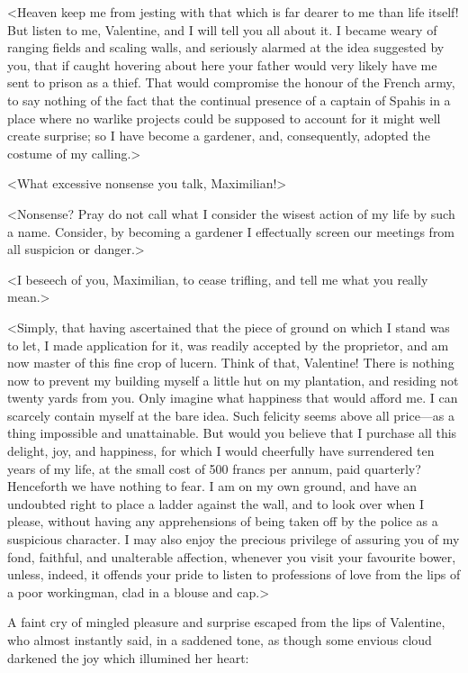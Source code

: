 <Heaven keep me from jesting with that which is far dearer to me than life itself! But listen to me, Valentine, and I will tell you all about it. I became weary of ranging fields and scaling walls, and seriously alarmed at the idea suggested by you, that if caught hovering about here your father would very likely have me sent to prison as a thief. That would compromise the honour of the French army, to say nothing of the fact that the continual presence of a captain of Spahis in a place where no warlike projects could be supposed to account for it might well create surprise; so I have become a gardener, and, consequently, adopted the costume of my calling.> 

 <What excessive nonsense you talk, Maximilian!> 

 <Nonsense? Pray do not call what I consider the wisest action of my life by such a name. Consider, by becoming a gardener I effectually screen our meetings from all suspicion or danger.>

<I beseech of you, Maximilian, to cease trifling, and tell me what you really mean.> 

 <Simply, that having ascertained that the piece of ground on which I stand was to let, I made application for it, was readily accepted by the proprietor, and am now master of this fine crop of lucern. Think of that, Valentine! There is nothing now to prevent my building myself a little hut on my plantation, and residing not twenty yards from you. Only imagine what happiness that would afford me. I can scarcely contain myself at the bare idea. Such felicity seems above all price—as a thing impossible and unattainable. But would you believe that I purchase all this delight, joy, and happiness, for which I would cheerfully have surrendered ten years of my life, at the small cost of 500 francs per annum, paid quarterly? Henceforth we have nothing to fear. I am on my own ground, and have an undoubted right to place a ladder against the wall, and to look over when I please, without having any apprehensions of being taken off by the police as a suspicious character. I may also enjoy the precious privilege of assuring you of my fond, faithful, and unalterable affection, whenever you visit your favourite bower, unless, indeed, it offends your pride to listen to professions of love from the lips of a poor workingman, clad in a blouse and cap.> 

 A faint cry of mingled pleasure and surprise escaped from the lips of Valentine, who almost instantly said, in a saddened tone, as though some envious cloud darkened the joy which illumined her heart: 

